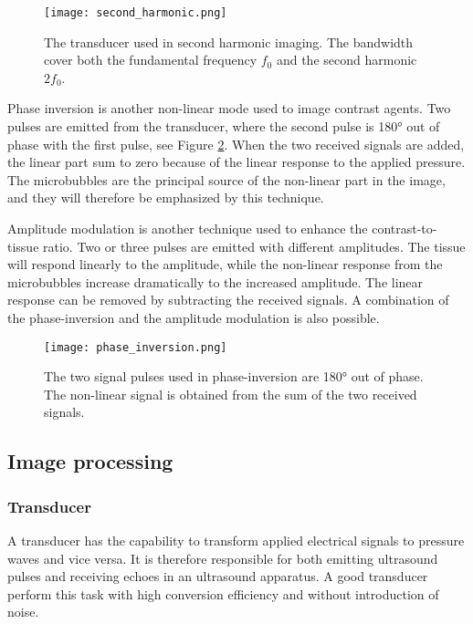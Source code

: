 \begin{figure}[h]
  \centering
  \label{Fig:Second harmonic}
  \texttt{[image: second\_harmonic.png]}
  \caption{The transducer used in second harmonic imaging. The bandwidth cover both the fundamental frequency $f_0$ and the second harmonic $2f_0$\cite{Hoskins2010}.}
\end{figure}
 
Phase inversion is another non-linear mode used to image contrast agents. Two pulses are emitted from the transducer, where the second pulse is \ang{180} out of phase with the first pulse, see Figure \ref{Fig:phase inversion}. When the two received signals are added, the linear part sum to zero because of the linear response to the applied pressure. The microbubbles are the principal source of the non-linear part in the image, and they will therefore be emphasized by this technique.

Amplitude modulation is another technique used to enhance the contrast-to-tissue ratio. Two or three pulses are emitted with different amplitudes. The tissue will respond linearly to the amplitude, while the non-linear response from the microbubbles increase dramatically to the increased amplitude. The linear response can be removed by subtracting the received signals. A combination of the phase-inversion and the amplitude modulation is also possible. 

\begin{figure}[h]
  \centering
  \label{Fig:phase inversion}
  \texttt{[image: phase\_inversion.png]}
  \caption{The two signal pulses used in phase-inversion are \ang{180} out of phase. The non-linear signal is obtained from the sum of the two received signals\cite{Hoskins2010}.}
\end{figure}



\subsection{Image processing}
\subsubsection{Transducer}
A transducer has the capability to transform applied electrical signals to pressure waves and vice versa. It is therefore responsible for both emitting ultrasound pulses and receiving echoes in an ultrasound apparatus. A good transducer perform this task with high conversion efficiency and without introduction of noise. 


